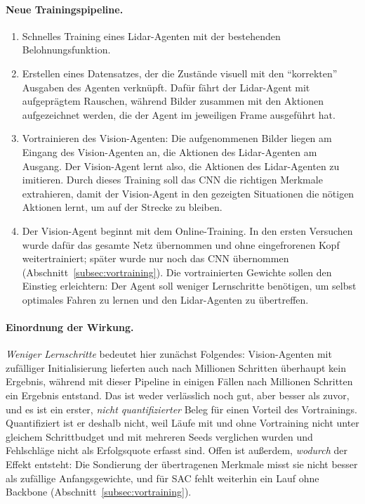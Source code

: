 \paragraph{Neue Trainingspipeline.}
\begin{enumerate}
  \item Schnelles Training eines Lidar-Agenten mit der bestehenden Belohnungsfunktion.
  \item Erstellen eines Datensatzes, der die Zustände visuell mit den \enquote{korrekten} Ausgaben des Agenten verknüpft. Dafür fährt der Lidar-Agent mit aufgeprägtem Rauschen, während Bilder zusammen mit den Aktionen aufgezeichnet werden, die der Agent im jeweiligen Frame ausgeführt hat.
  \item Vortrainieren des Vision-Agenten: Die aufgenommenen Bilder liegen am Eingang des Vision-Agenten an, die Aktionen des Lidar-Agenten am Ausgang. Der Vision-Agent lernt also, die Aktionen des Lidar-Agenten zu imitieren. Durch dieses Training soll das \ac{CNN} die richtigen Merkmale extrahieren, damit der Vision-Agent in den gezeigten Situationen die nötigen Aktionen lernt, um auf der Strecke zu bleiben.
  \item Der Vision-Agent beginnt mit dem Online-Training. In den ersten Versuchen wurde dafür das gesamte Netz übernommen und ohne eingefrorenen Kopf weitertrainiert; später wurde nur noch das \ac{CNN} übernommen (Abschnitt~\ref{subsec:vortraining}). Die vortrainierten Gewichte sollen den Einstieg erleichtern: Der Agent soll weniger Lernschritte benötigen, um selbst optimales Fahren zu lernen und den Lidar-Agenten zu übertreffen.
\end{enumerate}

\paragraph{Einordnung der Wirkung.}
\emph{Weniger Lernschritte} bedeutet hier zunächst Folgendes: Vision-Agenten mit zufälliger Initialisierung lieferten auch nach Millionen Schritten überhaupt kein Ergebnis, während mit dieser Pipeline in einigen Fällen nach Millionen Schritten ein Ergebnis entstand. Das ist weder verlässlich noch gut, aber besser als zuvor, und es ist ein erster, \emph{nicht quantifizierter} Beleg für einen Vorteil des Vortrainings. Quantifiziert ist er deshalb nicht, weil Läufe mit und ohne Vortraining nicht unter gleichem Schrittbudget und mit mehreren Seeds verglichen wurden und Fehlschläge nicht als Erfolgsquote erfasst sind. Offen ist außerdem, \emph{wodurch} der Effekt entsteht: Die Sondierung der übertragenen Merkmale misst sie nicht besser als zufällige Anfangsgewichte, und für \ac{SAC} fehlt weiterhin ein Lauf ohne Backbone (Abschnitt~\ref{subsec:vortraining}).

